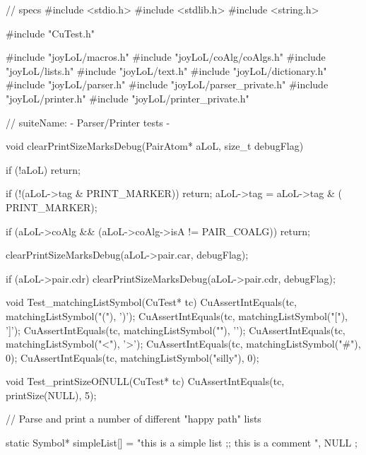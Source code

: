 \starttyping
// specs
#include <stdio.h>
#include <stdlib.h>
#include <string.h>

#include "CuTest.h"

#include "joyLoL/macros.h"
#include "joyLoL/coAlg/coAlgs.h"
#include "joyLoL/lists.h"
#include "joyLoL/text.h"
#include "joyLoL/dictionary.h"
#include "joyLoL/parser.h"
#include "joyLoL/parser_private.h"
#include "joyLoL/printer.h"
#include "joyLoL/printer_private.h"

// suiteName: - Parser/Printer tests -

void clearPrintSizeMarksDebug(PairAtom* aLoL, size_t debugFlag) {
  if (!aLoL) return;

  if (!(aLoL->tag & PRINT_MARKER)) return;
  aLoL->tag = aLoL->tag & (~ PRINT_MARKER);

  if (aLoL->coAlg && (aLoL->coAlg->isA != PAIR_COALG)) return;

  clearPrintSizeMarksDebug(aLoL->pair.car, debugFlag);

  if (aLoL->pair.cdr) {
    clearPrintSizeMarksDebug(aLoL->pair.cdr, debugFlag);
  }
}

void Test_matchingListSymbol(CuTest* tc) {
  CuAssertIntEquals(tc, matchingListSymbol("("), ')');
  CuAssertIntEquals(tc, matchingListSymbol("["), ']');
  CuAssertIntEquals(tc, matchingListSymbol("{"), '}');
  CuAssertIntEquals(tc, matchingListSymbol("<"), '>');
  CuAssertIntEquals(tc, matchingListSymbol("#"), 0);
  CuAssertIntEquals(tc, matchingListSymbol("silly"), 0);
}

void Test_printSizeOfNULL(CuTest* tc) {
  CuAssertIntEquals(tc, printSize(NULL), 5);
}

// Parse and print a number of different "happy path" lists

static Symbol* simpleList[] = {
  "this is a simple list ;; this is a comment ",
  NULL
};

